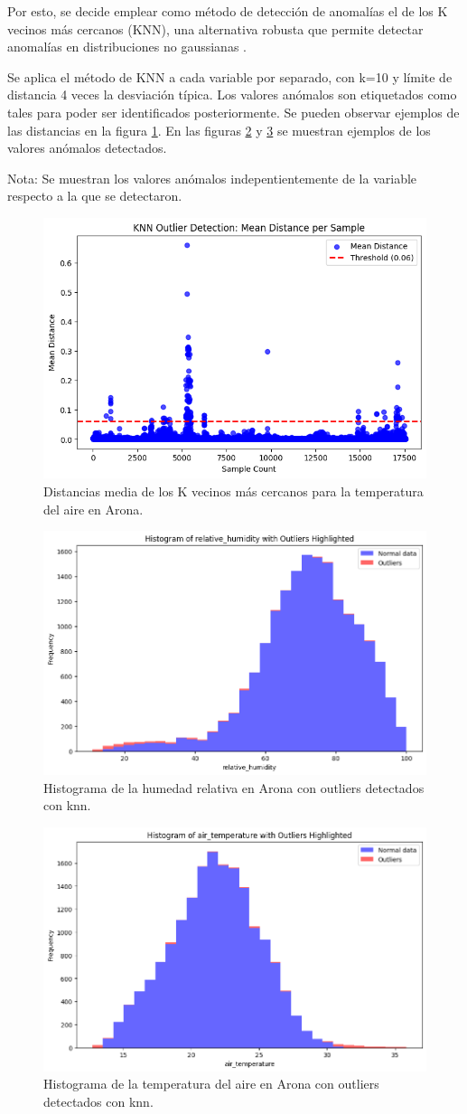 Por esto, se decide emplear como método de detección de anomalías el de los K vecinos más cercanos (KNN), 
una alternativa robusta que permite detectar anomalías en distribuciones no gaussianas \cite{gu2019}.

Se aplica el método de KNN a cada variable por separado, con k=10 y límite de distancia 4 veces la desviación típica. 
Los valores anómalos son etiquetados como tales para poder ser identificados posteriormente. Se pueden observar ejemplos 
de las distancias en la figura \ref{knn_distances}. En las figuras \ref{histogram_knn_humidity} y \ref{histogram_knn_temperature} se muestran ejemplos de los valores anómalos detectados. 

Nota: Se muestran los valores anómalos indepentientemente de la variable respecto a la que se detectaron.

\begin{figure}
    \centering
    \includegraphics[width=.5\linewidth]{images/knn_distances_temperature_arona.png}
    \caption{Distancias media de los K vecinos más cercanos para la temperatura del aire en Arona.}
    \label{knn_distances}
\end{figure}

\begin{figure}
    \centering
    \includegraphics[width=.5\linewidth]{images/histogram_humidity_knn.png}
    \caption{Histograma de la humedad relativa en Arona con outliers detectados con knn.}
    \label{histogram_knn_humidity}
\end{figure}

\begin{figure}
    \centering
    \includegraphics[width=.5\linewidth]{images/histogram_temperature_knn.png}
    \caption{Histograma de la temperatura del aire en Arona con outliers detectados con knn.}
    \label{histogram_knn_temperature}
\end{figure}

